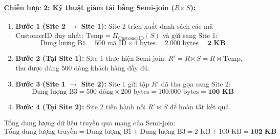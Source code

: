 \documentclass[12pt,a4paper]{report}
\begin{document}
\paragraph{Chiến lược 2: Kỹ thuật giảm tải bằng Semi-join ($R \ltimes S$):}
\begin{enumerate}[leftmargin=0.8cm, topsep=1pt, itemsep=1pt]
    \item \textbf{Bước 1 (Site 2 $\rightarrow$ Site 1):} Site 2 trích xuất danh sách các mã CustomerID duy nhất: $\text{Temp} = \Pi_{\text{CustomerID}}(S)$ và gửi sang Site 1:
    \[\text{Dung lượng B1} = 500 \text{ mã ID} \times 4 \text{ bytes} = 2.000 \text{ bytes} = \mathbf{2 \text{ KB}}\]
    \item \textbf{Bước 2 (Tại Site 1):} Site 1 thực hiện Semi-join: $R' = R \ltimes S = R \bowtie \text{Temp}$, thu được đúng $500$ dòng khách hàng đầy đủ.
    \item \textbf{Bước 3 (Site 1 $\rightarrow$ Site 2):} Site 1 gửi tập $R'$ đã thu gọn sang Site 2:
    \[\text{Dung lượng B3} = 500 \text{ dòng} \times 200 \text{ bytes} = 100.000 \text{ bytes} = \mathbf{100 \text{ KB}}\]
    \item \textbf{Bước 4 (Tại Site 2):} Site 2 tiến hành nối $R' \bowtie S$ để hoàn tất kết quả.
\end{enumerate}
Tổng dung lượng dữ liệu truyền qua mạng của Semi-join:
\[
\text{Tổng dung lượng truyền} = \text{Dung lượng B1} + \text{Dung lượng B3} = 2 \text{ KB} + 100 \text{ KB} = \mathbf{102 \text{ KB}}
\]
\end{document}
